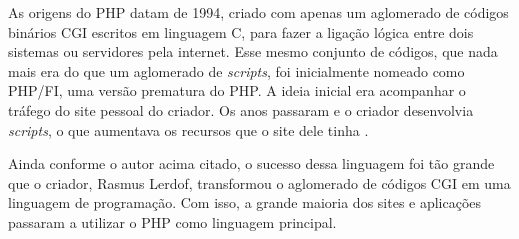 As origens do PHP datam de 1994, criado com apenas um aglomerado de códigos binários CGI escritos em linguagem C, para fazer a ligação lógica entre dois sistemas ou servidores pela internet. Esse mesmo conjunto de códigos, que nada mais era do que um aglomerado de \textit{scripts}, foi inicialmente nomeado como PHP/FI, uma versão prematura do PHP. A ideia inicial era acompanhar o tráfego do site pessoal do criador. Os anos passaram e o criador desenvolvia \textit{scripts}, o que aumentava os recursos que o site dele tinha \cite{phpdevelopment}.

Ainda conforme o autor acima citado, o sucesso dessa linguagem foi tão grande que o criador, Rasmus Lerdof, transformou o aglomerado de códigos CGI em uma linguagem de programação. Com isso, a grande maioria dos sites e aplicações passaram a utilizar o PHP como linguagem principal.

